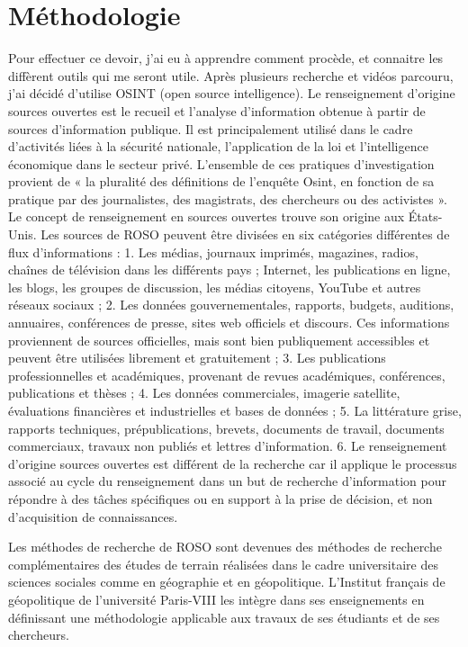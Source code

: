 \documentclass[french]{article}
\begin{document}
\section{Méthodologie}
Pour effectuer ce devoir, j’ai eu à apprendre comment procède, et connaitre les diffèrent outils qui me seront utile. Après plusieurs recherche et vidéos parcouru, j'ai décidé d'utilise OSINT (open source intelligence).
Le renseignement d'origine sources ouvertes est le recueil et l'analyse d'information obtenue à partir de sources d'information publique. Il est principalement utilisé dans le cadre d'activités liées à la sécurité nationale, l'application de la loi et l'intelligence économique dans le secteur privé. L'ensemble de ces pratiques d’investigation provient de « la pluralité des définitions de l’enquête Osint, en fonction de sa pratique par des journalistes, des magistrats, des chercheurs ou des activistes ». Le concept de renseignement en sources ouvertes trouve son origine aux États-Unis.
Les sources de ROSO peuvent être divisées en six catégories différentes de flux d'informations :
1.	Les médias, journaux imprimés, magazines, radios, chaînes de télévision dans les différents pays ; Internet, les publications en ligne, les blogs, les groupes de discussion, les médias citoyens, YouTube et autres réseaux sociaux ;
2.	Les données gouvernementales, rapports, budgets, auditions, annuaires, conférences de presse, sites web officiels et discours. Ces informations proviennent de sources officielles, mais sont bien publiquement accessibles et peuvent être utilisées librement et gratuitement ;
3.	Les publications professionnelles et académiques, provenant de revues académiques, conférences, publications et thèses ;
4.	Les données commerciales, imagerie satellite, évaluations financières et industrielles et bases de données ;
5.	La littérature grise, rapports techniques, prépublications, brevets, documents de travail, documents commerciaux, travaux non publiés et lettres d'information.
6.	Le renseignement d'origine sources ouvertes est différent de la recherche car il applique le processus associé au cycle du renseignement dans un but de recherche d'information pour répondre à des tâches spécifiques ou en support à la prise de décision, et non d'acquisition de connaissances.

Les méthodes de recherche de ROSO sont devenues des méthodes de recherche complémentaires des études de terrain réalisées dans le cadre universitaire des sciences sociales comme en géographie et en géopolitique. L'Institut français de géopolitique de l'université Paris-VIII les intègre dans ses enseignements en définissant une méthodologie applicable aux travaux de ses étudiants et de ses chercheurs.
\end{document}
